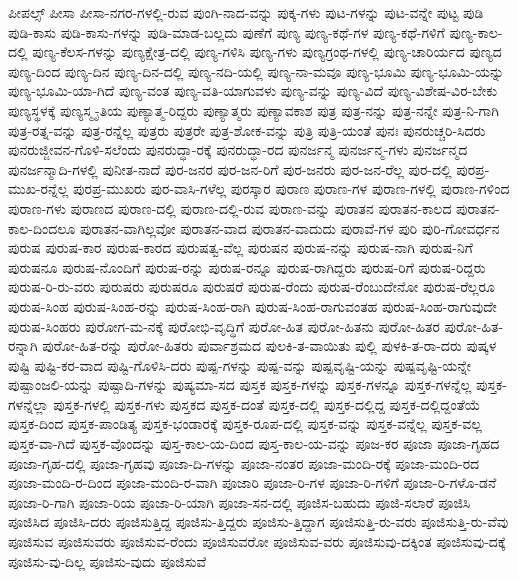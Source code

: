 {ಪೀಪಲ್ಸ್
ಪೀಸಾ
ಪೀಸಾ-ನಗರ-ಗಳಲ್ಲಿ-ರುವ
ಪುಂಗಿ-ನಾದ-ವನ್ನು
ಪುಕ್ಕ-ಗಳು
ಪುಟ-ಗಳನ್ನು
ಪುಟ-ವನ್ನೇ
ಪುಟ್ಟ
ಪುಡಿ
ಪುಡಿ-ಕಾಸು
ಪುಡಿ-ಕಾಸು-ಗಳನ್ನು
ಪುಡಿ-ಮಾಡ-ಬಲ್ಲದು
ಪುಣೆಗೆ
ಪುಣ್ಯ
ಪುಣ್ಯ-ಕಥೆ-ಗಳ
ಪುಣ್ಯ-ಕಥೆ-ಗಳಿಗೆ
ಪುಣ್ಯ-ಕಾಲ-ದಲ್ಲಿ
ಪುಣ್ಯ-ಕೆಲಸ-ಗಳನ್ನು
ಪುಣ್ಯಕ್ಷೇತ್ರ-ದಲ್ಲಿ
ಪುಣ್ಯ-ಗಳಿಸಿ
ಪುಣ್ಯ-ಗಳು
ಪುಣ್ಯಗ್ರಂಥ-ಗಳಲ್ಲಿ
ಪುಣ್ಯ-ಚಾರಿರ್ಯದ
ಪುಣ್ಯದ
ಪುಣ್ಯ-ದಿಂದ
ಪುಣ್ಯ-ದಿನ
ಪುಣ್ಯ-ದಿನ-ದಲ್ಲಿ
ಪುಣ್ಯ-ನದಿ-ಯಲ್ಲಿ
ಪುಣ್ಯ-ನಾ-ಮವೂ
ಪುಣ್ಯ-ಭೂಮಿ
ಪುಣ್ಯ-ಭೂಮಿ-ಯನ್ನು
ಪುಣ್ಯ-ಭೂಮಿ-ಯಾ-ಗಿದೆ
ಪುಣ್ಯ-ವಂತ
ಪುಣ್ಯ-ವತಿ-ಯಾಗುವಳು
ಪುಣ್ಯ-ವನ್ನು
ಪುಣ್ಯ-ವಿದೆ
ಪುಣ್ಯ-ವಿಶೇಷ-ವಿರ-ಬೇಕು
ಪುಣ್ಯಸ್ಥಳಕ್ಕೆ
ಪುಣ್ಯಸ್ಮೃ-ತಿಯ
ಪುಣ್ಯಾತ್ಮ-ರಿದ್ದರು
ಪುಣ್ಯಾತ್ಮರು
ಪುಣ್ಯಾವಕಾಶ
ಪುತ್ರ
ಪುತ್ರ-ನನ್ನು
ಪುತ್ರ-ನನ್ನೇ
ಪುತ್ರ-ನಿ-ಗಾಗಿ
ಪುತ್ರ-ರತ್ನ-ವನ್ನು
ಪುತ್ರ-ರನ್ನೆಲ್ಲ
ಪುತ್ರರು
ಪುತ್ರರೇ
ಪುತ್ರ-ಶೋಕ-ವನ್ನು
ಪುತ್ರಿ
ಪುತ್ರಿ-ಯಂತೆ
ಪುನಃ
ಪುನರುಚ್ಚರಿ-ಸಿದರು
ಪುನರುಜ್ಜೀವನ-ಗೊಳಿ-ಸಲೆಂದು
ಪುನರುದ್ಧಾ-ರಕ್ಕೆ
ಪುನರುದ್ಧಾ-ರದ
ಪುನರ್ಜನ್ಮ
ಪುನರ್ಜನ್ಮ-ಗಳು
ಪುನರ್ಜನ್ಮದ
ಪುನರ್ಜನ್ಮಾದಿ-ಗಳಲ್ಲಿ
ಪುನೀತ-ನಾದೆ
ಪುರ-ಜನರ
ಪುರ-ಜನ-ರಿಗೆ
ಪುರ-ಜನರು
ಪುರ-ಜನ-ರೆಲ್ಲ
ಪುರ-ದಲ್ಲಿ
ಪುರಪ್ರ-ಮುಖ-ರನ್ನೆಲ್ಲ
ಪುರಪ್ರ-ಮುಖರು
ಪುರ-ವಾಸಿ-ಗಳೆಲ್ಲ
ಪುರಸ್ಕಾರ
ಪುರಾಣ
ಪುರಾಣ-ಗಳ
ಪುರಾಣ-ಗಳಲ್ಲಿ
ಪುರಾಣ-ಗಳಿಂದ
ಪುರಾಣ-ಗಳು
ಪುರಾಣದ
ಪುರಾಣ-ದಲ್ಲಿ
ಪುರಾಣ-ದಲ್ಲಿ-ರುವ
ಪುರಾಣ-ವನ್ನು
ಪುರಾತನ
ಪುರಾತನ-ಕಾಲದ
ಪುರಾತನ-ಕಾಲ-ದಿಂದಲೂ
ಪುರಾತನ-ವಾಗಿಲ್ಲವೋ
ಪುರಾತನ-ವಾದ
ಪುರಾತನ-ವಾದುದು
ಪುರಾವೆ-ಗಳ
ಪುರಿ
ಪುರಿ-ಗೋವರ್ಧನ
ಪುರುಷ
ಪುರುಷ-ಕಾರ
ಪುರುಷ-ಕಾರದ
ಪುರುಷತ್ವ-ವೆಲ್ಲ
ಪುರುಷನ
ಪುರುಷ-ನನ್ನು
ಪುರುಷ-ನಾಗಿ
ಪುರುಷ-ನಿಗೆ
ಪುರುಷನೂ
ಪುರುಷ-ನೊಂದಿಗೆ
ಪುರುಷ-ರನ್ನು
ಪುರುಷ-ರನ್ನೂ
ಪುರುಷ-ರಾಗಿದ್ದರು
ಪುರುಷ-ರಿಗೆ
ಪುರುಷ-ರಿದ್ದರು
ಪುರುಷ-ರಿ-ರು-ವರು
ಪುರುಷರು
ಪುರುಷರೂ
ಪುರುಷರೆ
ಪುರುಷ-ರೆಂದು
ಪುರುಷ-ರೆಂಬುದೇನೋ
ಪುರುಷ-ರೆಲ್ಲರೂ
ಪುರುಷ-ಸಿಂಹ
ಪುರುಷ-ಸಿಂಹ-ರನ್ನು
ಪುರುಷ-ಸಿಂಹ-ರಾಗಿ
ಪುರುಷ-ಸಿಂಹ-ರಾಗುವಂತಹ
ಪುರುಷ-ಸಿಂಹ-ರಾಗುವುದೇ
ಪುರುಷ-ಸಿಂಹರು
ಪುರೋಗ-ಮ-ನಕ್ಕೆ
ಪುರೋಭಿ-ವೃದ್ಧಿಗೆ
ಪುರೋ-ಹಿತ
ಪುರೋ-ಹಿತನು
ಪುರೋ-ಹಿತರ
ಪುರೋ-ಹಿತ-ರನ್ನಾಗಿ
ಪುರೋ-ಹಿತ-ರನ್ನು
ಪುರೋ-ಹಿತರು
ಪುರ್ವಾಶ್ರಮದ
ಪುಲಕಿ-ತ-ವಾಯಿತು
ಪುಲ್ಲಿ
ಪುಳಕಿ-ತ-ರಾ-ದರು
ಪುಷ್ಕಳ
ಪುಷ್ಟಿ
ಪುಷ್ಟಿ-ಕರ-ವಾದ
ಪುಷ್ಟಿ-ಗೊಳಿಸಿ-ದರು
ಪುಷ್ಪ-ಗಳನ್ನು
ಪುಷ್ಪ-ವನ್ನು
ಪುಷ್ಪವೃಷ್ಟಿ-ಯನ್ನು
ಪುಷ್ಪವೃಷ್ಟಿ-ಯನ್ನೇ
ಪುಷ್ಪಾಂಜಲಿ-ಯನ್ನು
ಪುಷ್ಪಾದಿ-ಗಳನ್ನು
ಪುಷ್ಯಮಾ-ಸದ
ಪುಸ್ತಕ
ಪುಸ್ತಕ-ಗಳನ್ನು
ಪುಸ್ತಕ-ಗಳನ್ನೂ
ಪುಸ್ತಕ-ಗಳನ್ನೆಲ್ಲ
ಪುಸ್ತಕ-ಗಳನ್ನೆಲ್ಲಾ
ಪುಸ್ತಕ-ಗಳಲ್ಲಿ
ಪುಸ್ತಕ-ಗಳು
ಪುಸ್ತಕದ
ಪುಸ್ತಕ-ದಂತೆ
ಪುಸ್ತಕ-ದಲ್ಲಿ
ಪುಸ್ತಕ-ದಲ್ಲಿದ್ದ
ಪುಸ್ತಕ-ದಲ್ಲಿದ್ದಂತೆಯೆ
ಪುಸ್ತಕ-ದಿಂದ
ಪುಸ್ತಕ-ಪಾಂಡಿತ್ಯ
ಪುಸ್ತಕ-ಭಂಡಾರಕ್ಕೆ
ಪುಸ್ತಕ-ರೂಪ-ದಲ್ಲಿ
ಪುಸ್ತಕ-ವನ್ನು
ಪುಸ್ತಕ-ವನ್ನೆಲ್ಲ
ಪುಸ್ತಕ-ವಲ್ಲ
ಪುಸ್ತಕ-ವಾ-ಗಿದೆ
ಪುಸ್ತಕ-ವೊಂದನ್ನು
ಪುಸ್ತ-ಕಾಲ-ಯ-ದಿಂದ
ಪುಸ್ತ-ಕಾಲ-ಯ-ವನ್ನು
ಪೂಜ-ಕರ
ಪೂಜಾ
ಪೂಜಾ-ಗೃಹದ
ಪೂಜಾ-ಗೃಹ-ದಲ್ಲಿ
ಪೂಜಾ-ಗೃಹವು
ಪೂಜಾ-ದಿ-ಗಳನ್ನು
ಪೂಜಾ-ನಂತರ
ಪೂಜಾ-ಮಂದಿ-ರಕ್ಕೆ
ಪೂಜಾ-ಮಂದಿ-ರದ
ಪೂಜಾ-ಮಂದಿ-ರ-ದಿಂದ
ಪೂಜಾ-ಮಂದಿ-ರ-ವಾಗಿ
ಪೂಜಾರಿ
ಪೂಜಾ-ರಿ-ಗಳ
ಪೂಜಾ-ರಿ-ಗಳಿಗೆ
ಪೂಜಾ-ರಿ-ಗಳೊ-ಡನೆ
ಪೂಜಾ-ರಿ-ಗಾಗಿ
ಪೂಜಾ-ರಿಯ
ಪೂಜಾ-ರಿ-ಯಾಗಿ
ಪೂಜಾ-ಸನ-ದಲ್ಲಿ
ಪೂಜಿಸ-ಬಹುದು
ಪೂಜಿ-ಸಲಾರೆ
ಪೂಜಿಸಿ
ಪೂಜಿಸಿದ
ಪೂಜಿಸಿ-ದರು
ಪೂಜಿಸುತ್ತಿದ್ದ
ಪೂಜಿಸು-ತ್ತಿದ್ದರು
ಪೂಜಿಸು-ತ್ತಿದ್ದಾಗ
ಪೂಜಿಸುತ್ತಿ-ರು-ವರು
ಪೂಜಿಸುತ್ತಿ-ರು-ವೆವು
ಪೂಜಿಸುವ
ಪೂಜಿಸುವರು
ಪೂಜಿಸುವ-ರೆಂದು
ಪೂಜಿಸುವರೋ
ಪೂಜಿಸುವ-ವರು
ಪೂಜಿಸುವು-ದಕ್ಕಿಂತ
ಪೂಜಿಸುವು-ದಕ್ಕೆ
ಪೂಜಿಸು-ವು-ದಿಲ್ಲ
ಪೂಜಿಸು-ವುದು
ಪೂಜಿಸುವೆ
}
